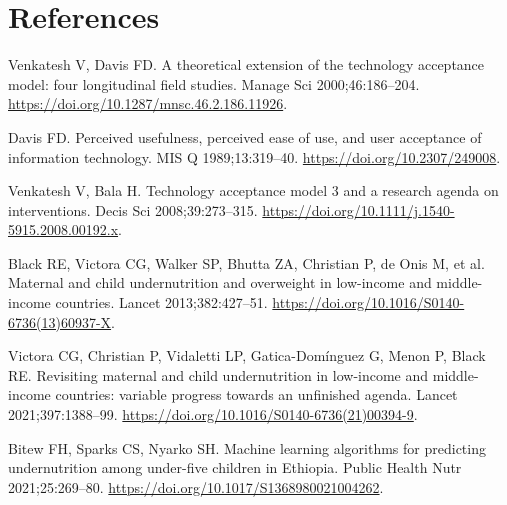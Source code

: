 \documentclass[11pt]{article}
\begin{document}
\section*{References}
\begin{enumerate}[label={[\arabic*]},leftmargin=2em,itemsep=2pt]\small
\item Venkatesh V, Davis FD. A theoretical extension of the technology acceptance model: four longitudinal field
studies. Manage Sci 2000;46:186--204. \url{https://doi.org/10.1287/mnsc.46.2.186.11926}.
\item Davis FD. Perceived usefulness, perceived ease of use, and user acceptance of information technology. MIS Q
1989;13:319--40. \url{https://doi.org/10.2307/249008}.
\item Venkatesh V, Bala H. Technology acceptance model 3 and a research agenda on interventions. Decis Sci
2008;39:273--315. \url{https://doi.org/10.1111/j.1540-5915.2008.00192.x}.
\item Black RE, Victora CG, Walker SP, Bhutta ZA, Christian P, de Onis M, et al. Maternal and child undernutrition and
overweight in low-income and middle-income countries. Lancet 2013;382:427--51.
\url{https://doi.org/10.1016/S0140-6736(13)60937-X}.
\item Victora CG, Christian P, Vidaletti LP, Gatica-Dom\'inguez G, Menon P, Black RE. Revisiting maternal and child
undernutrition in low-income and middle-income countries: variable progress towards an unfinished agenda. Lancet
2021;397:1388--99. \url{https://doi.org/10.1016/S0140-6736(21)00394-9}.
\item Bitew FH, Sparks CS, Nyarko SH. Machine learning algorithms for predicting undernutrition among under-five
children in Ethiopia. Public Health Nutr 2021;25:269--80. \url{https://doi.org/10.1017/S1368980021004262}.
\end{enumerate}
\end{document}
